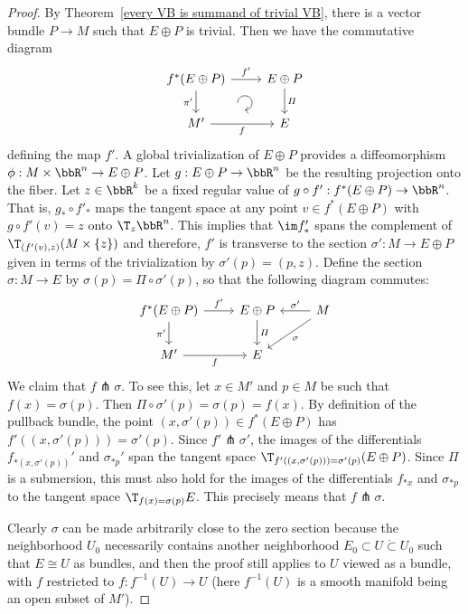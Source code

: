 \begin{proof}
By Theorem~\ref{every VB is summand of trivial VB}, there is a vector bundle $P{\to} M$ such that $E\oplus P$ is trivial. Then we have the commutative diagram
    \[\begin{tikzcd}[every matrix/.append style={name=m}, execute at end picture={\draw [<-] ([xshift=-11mm,yshift=1mm]m-2-2.north) arc[start angle=-90,delta angle=270,radius=0.2cm];}]
    f^\ast(E\oplus P) \arrow[r,"f'"]\arrow[d,swap,"\pi'"]& E\oplus P\arrow[d,"\varPi"] \\
    M'\arrow[r,swap,"f"]& E
    \end{tikzcd}\]
defining the map $f'$. A global trivialization of $E\oplus P$ provides a diffeomorphism $\phi:M\times\bbR^n\to E\oplus P$. Let $g:E\oplus P\to\bbR^n$ be the resulting projection onto the fiber. Let $z\in\bbR^k$ be a fixed regular value of $g\circ f':f^\ast(E\oplus P)\to\bbR^n$. That is, $g_\ast \circ f'_\ast$ maps the tangent space at any point $v\in f^\ast(E\oplus P)$ with $g\circ f'(v)=z$ onto $\T_z\bbR^n$. This implies that $\im f_\ast '$ spans the complement of $\T_{(f'(v),z)}(M\times\{z\})$ and therefore, $f'$ is transverse to the section $\sigma':M\to E\oplus P$ given in terms of the trivialization by $\sigma'(p)=(p,z)$. Define the section $\sigma:M\to E$ by $\sigma(p)=\varPi\circ \sigma'(p)$, so that the following diagram commutes:
  \[\begin{tikzcd}
    f^\ast(E\oplus P) \arrow[r,"f'"]\arrow[d,swap,"\pi'"]& E\oplus P\arrow[d,"\varPi"]& M\arrow[l,swap,"\sigma'"] \arrow[dl,"\sigma"]\\
    M'\arrow[r,swap,"f"]& E &
    \end{tikzcd}\]
We claim that $f\pitchfork \sigma$. To see this, let $x\in M'$ and $p\in M$ be such that $f(x)=\sigma(p)$. Then $\varPi\circ\sigma'(p)=\sigma(p)=f(x)$. By definition of the pullback bundle, the point $(x,\sigma'(p))\in f^\ast(E\oplus P)$ has $f'((x,\sigma'(p)))=\sigma'(p)$. Since $f'\pitchfork \sigma'$, the images of the differentials $f_{\ast(x,\sigma'(p))} '$ and $\sigma_{\ast p}'$ span the tangent space $\T_{f'((x,\sigma'(p)))=\sigma'(p)}(E\oplus P)$. Since $\varPi$ is a submersion, this must also hold for the images of the differentials $f_{\ast x}$ and $\sigma_{\ast p}$ to the tangent space $\T_{f(x)=\sigma(p)}E$. This precisely means that $f\pitchfork\sigma$.

Clearly $\sigma$ can be made arbitrarily close to the zero section because the neighborhood $U_0$ necessarily contains another neighborhood $E_0\subset U\mathring{\subset} U_0$ such that $E\cong U$ as bundles, and then the proof still applies to $U$ viewed as a bundle, with $f$ restricted to $f:f^{-1}(U)\to U$ (here $f^{-1}(U)$ is a smooth manifold being an open subset of $M'$).
\end{proof}

